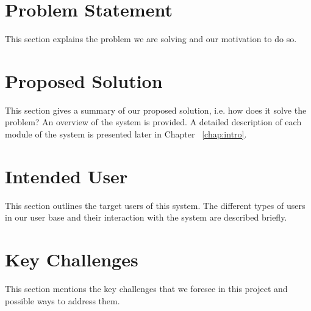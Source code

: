 \section{Problem Statement}

This section explains the problem we are solving and our motivation to do so.

\section{Proposed Solution}

This section gives a summary of our proposed solution, i.e. how does it solve the problem? An overview of the system is provided. A detailed description of each module of the system is presented later in Chapter ~\ref{chap:intro}.

\section{Intended User}

This section outlines the target users of this system. The different types of users in our user base and their interaction with the system are described briefly.

\section{Key Challenges}

This section mentions the key challenges that we foresee in this project and possible ways to address them.